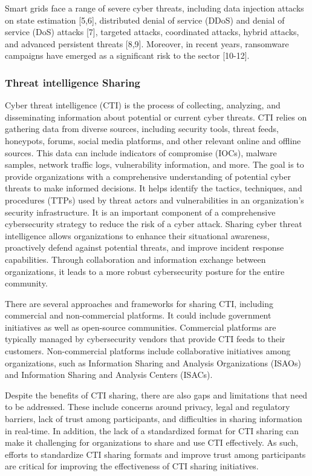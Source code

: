 \documentclass{article}
\begin{document}
Smart grids face a range of severe cyber threats, including data injection attacks on state estimation [5,6], distributed denial of service (DDoS) and denial of service (DoS) attacks [7], targeted attacks, coordinated attacks, hybrid attacks, and advanced persistent threats [8,9]. Moreover, in recent years, ransomware campaigns have emerged as a significant risk to the sector [10-12].



\subsubsection*{Threat intelligence Sharing}
Cyber threat intelligence (CTI) is the process of collecting, analyzing, and disseminating information about potential or current cyber threats. CTI relies on gathering data from diverse sources, including security tools, threat feeds, honeypots, forums, social media platforms, and other relevant online and offline sources. This data can include indicators of compromise (IOCs), malware samples, network traffic logs, vulnerability information, and more. The goal is to provide organizations with a comprehensive understanding of potential cyber threats to make informed decisions. It helps identify the tactics, techniques, and procedures (TTPs) used by threat actors and vulnerabilities in an organization's security infrastructure. It is an important component of a comprehensive cybersecurity strategy to reduce the risk of a cyber attack. Sharing cyber threat intelligence allows organizations to enhance their situational awareness, proactively defend against potential threats, and improve incident response capabilities. Through collaboration and information exchange between organizations, it leads to a more robust cybersecurity posture for the entire community.

There are several approaches and frameworks for sharing CTI, including commercial and non-commercial platforms. It could include government initiatives as well as open-source communities. Commercial platforms are typically managed by cybersecurity vendors that provide CTI feeds to their customers. Non-commercial platforms include collaborative initiatives among organizations, such as Information Sharing and Analysis Organizations (ISAOs) and Information Sharing and Analysis Centers (ISACs).

Despite the benefits of CTI sharing, there are also gaps and limitations that need to be addressed. These include concerns around privacy, legal and regulatory barriers, lack of trust among participants, and difficulties in sharing information in real-time. In addition, the lack of a standardized format for CTI sharing can make it challenging for organizations to share and use CTI effectively. As such, efforts to standardize CTI sharing formats and improve trust among participants are critical for improving the effectiveness of CTI sharing initiatives.
\end{document}
